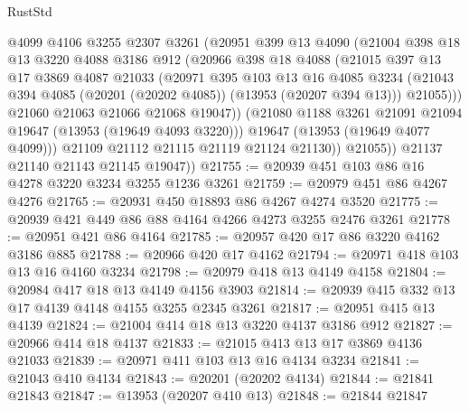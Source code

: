 \begin{lexlean}{RustStd}
\begin{coremodule}
                  @4099
                  @4106
                  @3255
                  @2307
                  @3261
                  (@20951
                    @399
                    @13
                    @4090
                    (@21004
                      @398
                      @18
                      @13
                      @3220
                      @4088
                      @3186
                      @912
                      (@20966
                        @398
                        @18
                        @4088
                        (@21015
                          @397
                          @13
                          @17
                          @3869
                          @4087
                          @21033
                          (@20971
                            @395
                            @103
                            @13
                            @16
                            @4085
                            @3234
                            (@21043 @394 @4085 (@20201 (@20202 @4085)) (@13953 (@20207 @394 @13)))
                            @21055)))
                      @21060
                      @21063
                      @21066
                      @21068
                      @19047))
                  (@21080 @1188 @3261 @21091 @21094 @19647 (@13953 (@19649 @4093 @3220)))
                  @19647
                  (@13953 (@19649 @4077 @4099)))
                @21109
                @21112
                @21115
                @21119
                @21124
                @21130))
            @21055))
        @21137
        @21140
        @21143
        @21145
        @19047))
@21755 := @20939 @451 @103 @86 @16 @4278 @3220 @3234 @3255 @1236 @3261
@21759 := @20979 @451 @86 @4267 @4276
@21765 := @20931 @450 @18893 @86 @4267 @4274 @3520
@21775 := @20939 @421 @449 @86 @88 @4164 @4266 @4273 @3255 @2476 @3261
@21778 := @20951 @421 @86 @4164
@21785 := @20957 @420 @17 @86 @3220 @4162 @3186 @885
@21788 := @20966 @420 @17 @4162
@21794 := @20971 @418 @103 @13 @16 @4160 @3234
@21798 := @20979 @418 @13 @4149 @4158
@21804 := @20984 @417 @18 @13 @4149 @4156 @3903
@21814 := @20939 @415 @332 @13 @17 @4139 @4148 @4155 @3255 @2345 @3261
@21817 := @20951 @415 @13 @4139
@21824 := @21004 @414 @18 @13 @3220 @4137 @3186 @912
@21827 := @20966 @414 @18 @4137
@21833 := @21015 @413 @13 @17 @3869 @4136 @21033
@21839 := @20971 @411 @103 @13 @16 @4134 @3234
@21841 := @21043 @410 @4134
@21843 := @20201 (@20202 @4134)
@21844 := @21841 @21843
@21847 := @13953 (@20207 @410 @13)
@21848 := @21844 @21847

\end{coremodule}
\end{lexlean}
